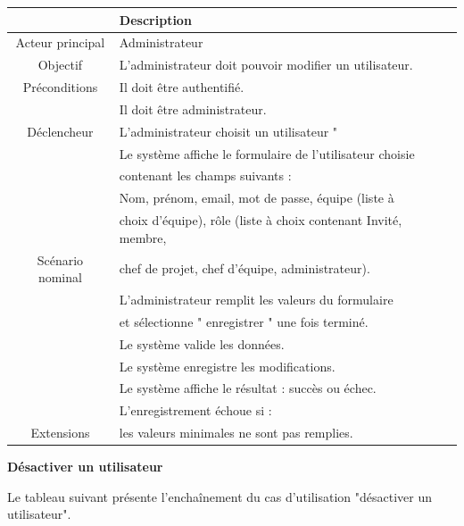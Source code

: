 \begin{center}
\begin{tabular}{|c|l|}
\hline 
&\textbf { Description }\\\hline 
    Acteur principal & Administrateur \\\hline 
    Objectif&L’administrateur doit pouvoir modifier un utilisateur.\\\hline
    Préconditions&Il doit être authentifié.  \\&Il doit être administrateur.\\\hline 
    Déclencheur&L’administrateur choisit un utilisateur "\\\hline 
    &Le système affiche le formulaire de l'utilisateur choisie   \\&contenant les champs suivants : \\
    &Nom, prénom, email, mot de passe, équipe (liste à \\
    &choix d’équipe), rôle (liste à choix contenant Invité, membre,\\Scénario nominal&chef de projet, chef d’équipe, administrateur).\\
    &L’administrateur remplit les valeurs du formulaire \\
    & et sélectionne " enregistrer " une fois terminé.\\
    &Le système valide les données. \\
    &Le système enregistre les modifications.   \\
    &Le système affiche le résultat : succès ou échec. \\\hline
    &L’enregistrement échoue si :  \\
    Extensions&les valeurs minimales ne sont pas remplies.  \\\hline
\end{tabular}
\label{desc_modif_ut}
\end{center}\newpage
\par \textbf{ 	 	Désactiver un utilisateur}
\par Le tableau suivant présente l'enchaînement du cas d'utilisation "désactiver un utilisateur".
